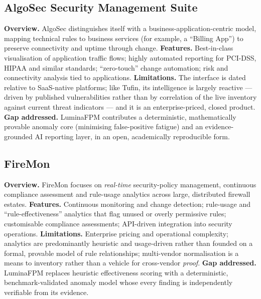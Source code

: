 \documentclass[12pt,a4paper]{report}
\renewcommand{\_}{\textunderscore\allowbreak}
\begin{document}
\subsection{AlgoSec Security Management Suite}
\textbf{Overview.} AlgoSec distinguishes itself with a business-application-centric model, mapping technical rules to business services (for example, a ``Billing App'') to preserve connectivity and uptime through change.
\textbf{Features.} Best-in-class visualisation of application traffic flows; highly automated reporting for PCI-DSS, HIPAA and similar standards; ``zero-touch'' change automation; risk and connectivity analysis tied to applications.
\textbf{Limitations.} The interface is dated relative to SaaS-native platforms; like Tufin, its intelligence is largely reactive --- driven by published vulnerabilities rather than by correlation of the live inventory against current threat indicators --- and it is an enterprise-priced, closed product.
\textbf{Gap addressed.} LuminaFPM contributes a deterministic, mathematically provable anomaly core (minimising false-positive fatigue) and an evidence-grounded AI reporting layer, in an open, academically reproducible form.

\subsection{FireMon}
\textbf{Overview.} FireMon focuses on \emph{real-time} security-policy management, continuous compliance assessment and rule-usage analytics across large, distributed firewall estates.
\textbf{Features.} Continuous monitoring and change detection; rule-usage and ``rule-effectiveness'' analytics that flag unused or overly permissive rules; customisable compliance assessments; API-driven integration into security operations.
\textbf{Limitations.} Enterprise pricing and operational complexity; analytics are predominantly heuristic and usage-driven rather than founded on a formal, provable model of rule relationships; multi-vendor normalisation is a means to inventory rather than a vehicle for cross-vendor \emph{proof}.
\textbf{Gap addressed.} LuminaFPM replaces heuristic effectiveness scoring with a deterministic, benchmark-validated anomaly model whose every finding is independently verifiable from its evidence.
\end{document}
